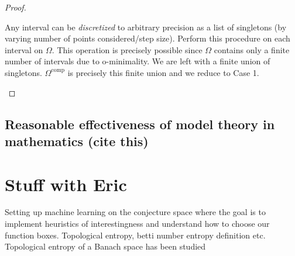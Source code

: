 \begin{proof}
\begin{itemize}
        Any interval can be \textit{discretized} to arbitrary precision as a list of singletons (by varying number of points considered/step size). Perform this procedure on each interval on $\Omega$. This operation is precisely possible since $\Omega$ contains only a finite number of intervals due to o-minimality. We are left with a finite union of singletons. $\Omega^\text{comp}$ is precisely this finite union and we reduce to Case 1.
    \end{itemize}
\end{proof}

\subsection{Reasonable effectiveness of model theory in mathematics (cite this)}
\section{Stuff with Eric}
Setting up machine learning on the conjecture space where the goal is to implement heuristics of interestingness and understand how to choose our function boxes.
Topological entropy, betti number entropy definition etc. Topological entropy of a Banach space has been studied \cite{bobokTopologicalEntropyBanach2011}
